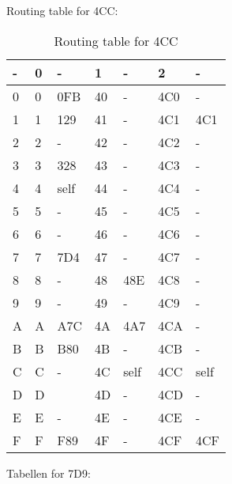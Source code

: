 \documentclass{article}
\begin{document}
Routing table for 4CC:

\begin{table}[h!]
    \center
    \begin{tabular}{| l | l | l | l | l | l | l |}
    \hline
    - & 0 & -    & 1  & -    & 2   & -    \\
    \hline
    0 & 0 & 0FB  & 40 & -    & 4C0 & -    \\
    \hline
    1 & 1 & 129  & 41 & -    & 4C1 & 4C1  \\
    \hline
    2 & 2 & -    & 42 & -    & 4C2 & -    \\
    \hline
    3 & 3 & 328  & 43 & -    & 4C3 & -    \\
    \hline
    4 & 4 & \cellcolor[gray]{0.8} self & 44 & -    & 4C4 & -    \\
    \hline
    5 & 5 & -    & 45 & -    & 4C5 & -    \\
    \hline
    6 & 6 & -    & 46 & -    & 4C6 & -    \\
    \hline
    7 & 7 & 7D4  & 47 & -    & 4C7 & -    \\
    \hline
    8 & 8 & -    & 48 & 48E  & 4C8 & -    \\
    \hline
    9 & 9 & -    & 49 & -    & 4C9 & -    \\
    \hline
    A & A & A7C  & 4A & 4A7  & 4CA & -    \\
    \hline
    B & B & B80  & 4B & -    & 4CB & -    \\
    \hline
    C & C & -    & 4C & \cellcolor[gray]{0.8} self & 4CC & self \\
    \hline
    D & D & ~    & 4D & -    & 4CD & -    \\
    \hline
    E & E & -    & 4E & -    & 4CE & -    \\
    \hline
    F & F & F89  & 4F & -    & 4CF & 4CF  \\
    \hline
    \end{tabular}
    \caption{Routing table for 4CC}
\end{table}

Tabellen for 7D9:
\end{document}
